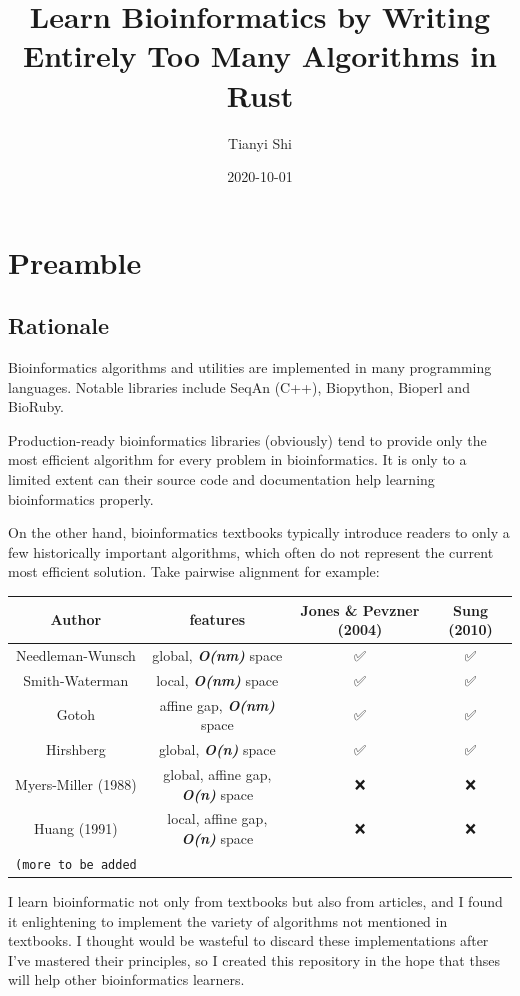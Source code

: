 \documentclass[
]{book}
\title{Learn Bioinformatics by Writing Entirely Too Many Algorithms in Rust}
\author{Tianyi Shi}
\date{2020-10-01}
\begin{document}
\maketitle

{
\setcounter{tocdepth}{1}
\tableofcontents
}
\hypertarget{preamble}{%
\chapter*{Preamble}\label{preamble}}

\hypertarget{rationale}{%
\section*{Rationale}\label{rationale}}

Bioinformatics algorithms and utilities are implemented in many programming languages. Notable libraries include SeqAn (C++), Biopython, Bioperl and BioRuby.

Production-ready bioinformatics libraries (obviously) tend to provide only the most efficient algorithm for every problem in bioinformatics. It is only to a limited extent can their source code and documentation help learning bioinformatics properly.

On the other hand, bioinformatics textbooks typically introduce readers to only a few historically important algorithms, which often do not represent the current most efficient solution. Take pairwise alignment for example:

\begin{longtable}[]{@{}cccc@{}}
\toprule
Author & features & Jones \& Pevzner (2004) & Sung (2010)\tabularnewline
\midrule
\endhead
Needleman-Wunsch & global, \textbf{\emph{O(nm)}} space & ✅ & ✅\tabularnewline
Smith-Waterman & local, \textbf{\emph{O(nm)}} space & ✅ & ✅\tabularnewline
Gotoh & affine gap, \textbf{\emph{O(nm)}} space & ✅ & ✅\tabularnewline
Hirshberg & global, \textbf{\emph{O(n)}} space & ✅ & ✅\tabularnewline
Myers-Miller (1988) & global, affine gap, \textbf{\emph{O(n)}} space & ❌ & ❌\tabularnewline
Huang (1991) & local, affine gap, \textbf{\emph{O(n)}} space & ❌ & ❌\tabularnewline
\texttt{(more\ to\ be\ added} & & &\tabularnewline
\bottomrule
\end{longtable}

I learn bioinformatic not only from textbooks but also from articles, and I found it enlightening to implement the variety of algorithms not mentioned in textbooks. I thought would be wasteful to discard these implementations after I've mastered their principles, so I created this repository in the hope that thses will help other bioinformatics learners.
\end{document}
